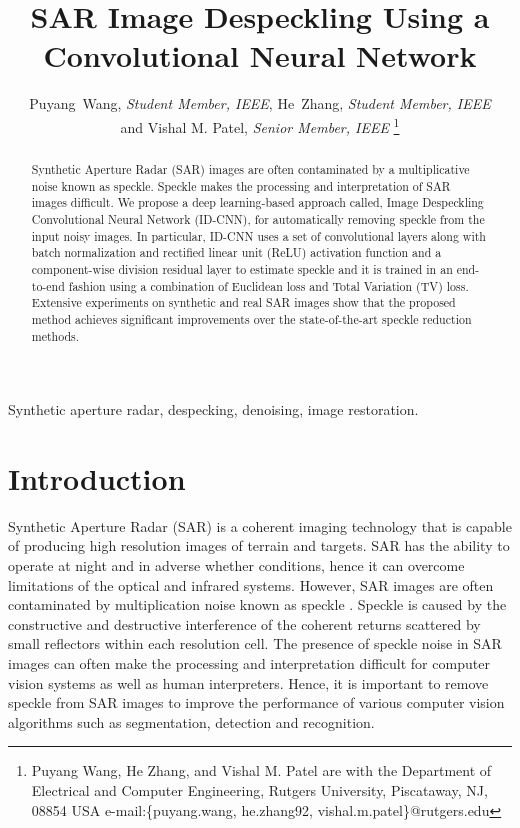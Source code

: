 \documentclass[journal]{IEEEtran}
\begin{document}
\title{SAR Image Despeckling Using a Convolutional Neural Network}

\author{Puyang~Wang, \emph{Student Member, IEEE}, He~Zhang,  \emph{Student Member, IEEE}\\ and Vishal M. Patel, \emph{Senior Member, IEEE}
\thanks{Puyang Wang, He Zhang, and Vishal M. Patel are with the Department
of Electrical and Computer Engineering, Rutgers University, Piscataway,
NJ, 08854 USA e-mail:\{puyang.wang, he.zhang92, vishal.m.patel\}@rutgers.edu}
}


\maketitle

\begin{abstract}
Synthetic Aperture Radar (SAR) images are often contaminated by a multiplicative noise known as speckle.  Speckle makes the processing and interpretation of SAR images difficult.  We propose a deep learning-based approach called, Image Despeckling Convolutional Neural Network (ID-CNN), for automatically removing speckle from the input noisy images. 
In particular, ID-CNN uses a set of convolutional layers along with batch normalization and rectified linear unit (ReLU) activation function and a component-wise division residual layer  to estimate speckle and it is trained in an end-to-end fashion using a combination of Euclidean loss and Total Variation (TV) loss.  Extensive experiments on synthetic and real SAR images show that the proposed method achieves significant improvements over the state-of-the-art speckle reduction methods.
\end{abstract}

\begin{IEEEkeywords}
Synthetic aperture radar, despecking, denoising, image restoration. 
\end{IEEEkeywords}


\IEEEpeerreviewmaketitle



\section{Introduction}\label{sec:intro}
Synthetic Aperture Radar (SAR) is a coherent imaging technology that is capable of producing high resolution images of terrain and targets.   SAR has the ability to operate at night and in adverse whether conditions, hence it can overcome limitations of the optical and infrared systems.  However, SAR images are often contaminated by multiplication noise known as speckle \cite{Speckle_Goodman}.  Speckle is caused by the
constructive and destructive interference of the coherent returns scattered by small reflectors within each resolution cell.  The presence of speckle noise in SAR images can often make the processing and interpretation difficult for computer vision systems as well as human interpreters.  Hence, it is important to remove speckle from SAR images to improve the performance of various computer vision algorithms such as segmentation, detection and recognition.  
\end{document}
